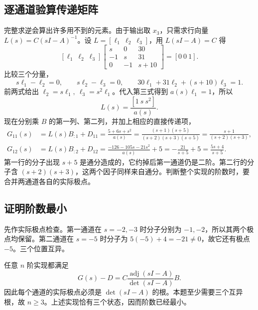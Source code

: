 \subsection{逐通道验算传递矩阵}

完整求逆会算出许多用不到的元素。由于输出取 $x_3$，只需求行向量 $L(s)=C(sI-A)^{-1}$。设 $L=[\ell_1\ \ell_2\ \ell_3]$，用 $L(sI-A)=C$ 得
\[
    [\ell_1\ \ell_2\ \ell_3]
    \begin{bmatrix}s&0&30\\-1&s&31\\0&-1&s+10\end{bmatrix}
    =[0\ 0\ 1].
\]
比较三个分量，
\[
    s\ell_1-\ell_2=0,\qquad s\ell_2-\ell_3=0,\qquad
    30\ell_1+31\ell_2+(s+10)\ell_3=1.
\]
前两式给出 $\ell_2=s\ell_1,\ \ell_3=s^2\ell_1$。代入第三式得到
$a(s)\ell_1=1$，所以
\[
    L(s)=\frac{[1\ s\ s^2]}{a(s)}.
\]
现在分别乘 $B$ 的第一列、第二列，并加上相应的直接传递项，
\[
\begin{aligned}
    G_{11}(s)&=L(s)B_{:1}+D_{11}
     =\frac{5+6s+s^2}{a(s)}
     =\frac{(s+1)(s+5)}{(s+2)(s+3)(s+5)}
     =\frac{s+1}{(s+2)(s+3)},\\
    G_{12}(s)&=L(s)B_{:2}+D_{12}
     =\frac{-126-105s-21s^2}{a(s)}+5
     =-\frac{21}{s+5}+5
     =\frac{5s+4}{s+5}.
\end{aligned}
\]
第一行的分子出现 $s+5$ 是通分造成的，它约掉后第一通道仍是二阶。第二行的分子含 $(s+2)(s+3)$，这两个因子同样来自通分。判断整个实现的阶数时，要合并两通道各自的实际极点。

\subsection{证明阶数最小}

先作实际极点检查。第一通道在 $s=-2,-3$ 时分子分别为 $-1,-2$，所以其两个极点均保留。第二通道在 $s=-5$ 时分子为 $5(-5)+4=-21\ne0$，故它还有极点 $-5$。三个位置互异。

任意 $n$ 阶实现都满足
\[
    G(s)-D=C\frac{\operatorname{adj}(sI-A)}{\det(sI-A)}B .
\]
因此每个通道的实际极点必须是 $\det(sI-A)$ 的根。本题至少需要三个互异根，故 $n\ge3$。上述实现恰有三个状态，因而阶数已经最小。

